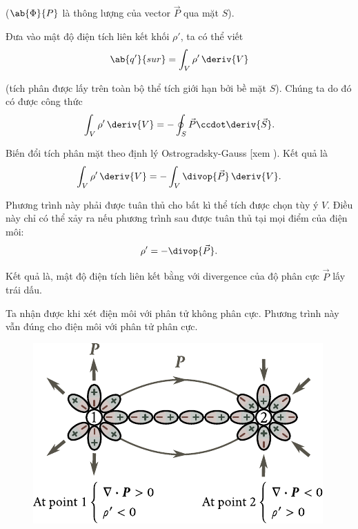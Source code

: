 \noindent
($\ab{\Phi}{P}$ là thông lượng của vector $\vec{P}$ qua mặt $S$).

Đưa vào mật độ điện tích liên kết khối $\rho'$, ta có thể viết
\begin{equation*}
    \ab{q'}{sur} = \int_V \rho'\, \deriv{V}
\end{equation*}

\noindent
(tích phân được lấy trên toàn bộ thể tích giới hạn bởi bề mặt $S$). Chúng ta do đó có được công thức
\begin{equation*}
    \int_V \rho'\, \deriv{V} = - \oint_S \vec{P} \ccdot \deriv{\vec{S}}.
\end{equation*}

\noindent
Biến đổi tích phân mặt theo định lý Ostrogradsky-Gauss [xem ). Kết quả là
\begin{equation*}
    \int_V \rho'\, \deriv{V} = - \int_V \divop{\vec{P}}\, \deriv{V}.
\end{equation*}

\noindent
Phương trình này phải được tuân thủ cho bất kì thể tích được chọn tùy ý $V$. Điều này chỉ có thể xảy ra nếu phương trình sau được tuân thủ tại mọi điểm của điện môi:
\begin{equation}\label{eq:2_12}
    \rho' = - \divop{\vec{P}}.
\end{equation}

\noindent
Kết quả là, mật độ điện tích liên kết bằng với divergence của độ phân cực $\vec{P}$ lấy trái dấu.

Ta nhận được  khi xét điện môi với phân tử không phân cực. Phương trình này vẫn đúng cho điện môi với phân tử phân cực.

\begin{figure}[!htb]
	\begin{center}
		\includegraphics[scale=1]{figures/ch_02/fig_2_4.pdf}
		\caption[]{}
		\label{fig:2_4}
	\end{center}
	\vspace{-0.8cm}
\end{figure}


